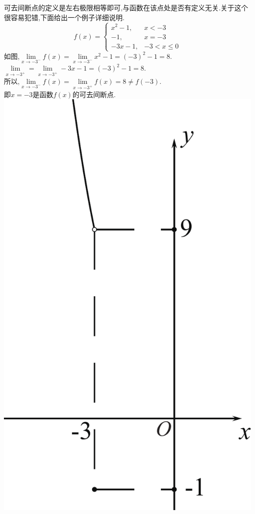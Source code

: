 \begin{tcolorbox}[sidebyside,colframe=red!75!black, colback=yellow!10!white,title=注意,sidebyside align=top seam,
	righthand width=4cm,fonttitle =\CJKfamily{heiti}]
	\kg 可去间断点的定义是左右极限相等即可,与函数在该点处是否有定义无关.关于这个很容易犯错,下面给出一个例子详细说明.
	\[
	f(x)=
	\begin{cases}
		x^2-1,&x<-3\\
		-1,&x=-3\\
		-3x-1,&-3<x\le 0
	\end{cases}
	\]
	如图,$\lim\limits_{x \to -3^-}f(x)=\lim\limits_{x \to -3^-}x^2-1=(-3)^2-1=8.$\\[0.5em]
	$\lim\limits_{x \to -3^+}=\lim\limits_{x \to -3^+}-3x-1=(-3)^2-1=8.$\\[0.5em]
	所以,$\lim\limits_{x \to -3^-}f(x)=\lim\limits_{x \to -3^+}f(x)=8 \neq f(-3).$\\[0.5em]
	即$x=-3$是函数$f(x)$的可去间断点.
	\tcblower
	\centering
	\includegraphics[width=\linewidth]{pic/C-1/可去间断点.pdf}
\end{tcolorbox}

